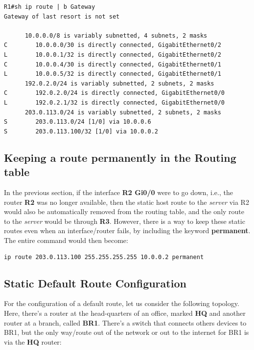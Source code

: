 \vspace{-15pt}
\begin{verbatim}
R1#sh ip route | b Gateway
Gateway of last resort is not set

      10.0.0.0/8 is variably subnetted, 4 subnets, 2 masks
C        10.0.0.0/30 is directly connected, GigabitEthernet0/2
L        10.0.0.1/32 is directly connected, GigabitEthernet0/2
C        10.0.0.4/30 is directly connected, GigabitEthernet0/1
L        10.0.0.5/32 is directly connected, GigabitEthernet0/1
      192.0.2.0/24 is variably subnetted, 2 subnets, 2 masks
C        192.0.2.0/24 is directly connected, GigabitEthernet0/0
L        192.0.2.1/32 is directly connected, GigabitEthernet0/0
      203.0.113.0/24 is variably subnetted, 2 subnets, 2 masks
S        203.0.113.0/24 [1/0] via 10.0.0.6
S        203.0.113.100/32 [1/0] via 10.0.0.2
\end{verbatim}
\vspace{-10pt}

\subsection{Keeping a route permanently in the Routing table}
In the previous section, if the interface \textbf{R2 Gi0/0} were to go down, i.e., the router \textbf{R2} was no longer available, then the static host route to the \textit{server} via R2 would also be automatically removed from the routing table, and the only route to the \textit{server} would be through \textbf{R3}. However, there is a way to keep these static routes even when an interface/router fails, by including the keyword \textbf{permanent}. The entire command would then become: 

\vspace{-10pt}
\begin{center}
\verb|ip route 203.0.113.100 255.255.255.255 10.0.0.2 permanent|
\end{center}

\subsection{Static Default Route Configuration}
For the configuration of a default route, let us consider the following topology. Here, there's a router at the head-quarters of an office, marked \textbf{HQ} and another router at a branch, called \textbf{BR1}. There's a switch that connects others devices to BR1, but the only way/route out of the network or out to the internet for BR1 is via the \textbf{HQ} router: 

